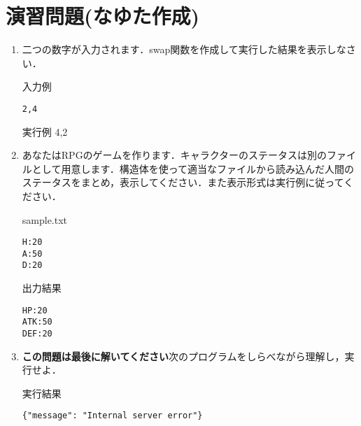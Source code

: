 \section{演習問題(なゆた作成)}
\begin{enumerate}
\item 二つの数字が入力されます．swap関数を作成して実行した結果を表示しなさい．
\begin{itembox}{入力例}
\begin{verbatim}
2,4
\end{verbatim}
\end{itembox}

\begin{itembox}{実行例}
4,2
\end{itembox}
\item あなたはRPGのゲームを作ります．キャラクターのステータスは別のファイルとして用意します．構造体を使って適当なファイルから読み込んだ人間のステータスをまとめ，表示してください．また表示形式は実行例に従ってください．
\begin{itembox}{sample.txt}
\begin{verbatim}
H:20
A:50
D:20
\end{verbatim}
\end{itembox}

\begin{itembox}{出力結果}
\begin{verbatim}
HP:20
ATK:50
DEF:20
\end{verbatim}
\end{itembox}

\item \textbf{この問題は最後に解いてください}次のプログラムをしらべながら理解し，実行せよ．

\begin{itembox}{実行結果}
\begin{verbatim}
{"message": "Internal server error"}
\end{verbatim}
\end{itembox}
\end{enumerate}